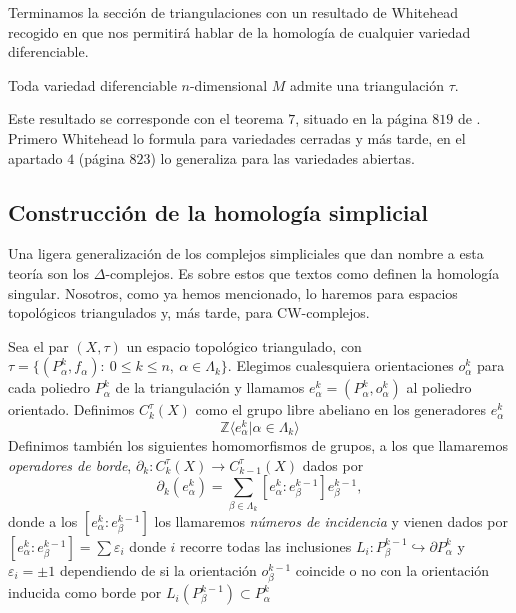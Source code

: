 \bigskip

Terminamos la sección de triangulaciones con un resultado de Whitehead recogido en \cite{Whitehead1978} que nos permitirá hablar de la homología de cualquier variedad diferenciable.

\begin{theorem}
    Toda variedad diferenciable $n$-dimensional $M$ admite una triangulación $\tau$.
\end{theorem}

Este resultado se corresponde con el teorema $7$, situado en la página $819$ de \cite{Whitehead1978}. Primero Whitehead lo formula para variedades cerradas y más tarde, en el apartado $4$ (página $823$) lo generaliza para las variedades abiertas.
\bigskip


\subsection{Construcción de la homología simplicial}

Una ligera generalización de los complejos simpliciales que dan nombre a esta teoría son los $\Delta$-complejos. Es sobre estos que textos como \cite{hatcher2002} definen la homología singular. Nosotros, como ya hemos mencionado, lo haremos para espacios topológicos triangulados y, más tarde, para CW-complejos.

\bigskip

\begin{definition}
    Sea el par $(X,\tau)$ un espacio topológico triangulado, con $\tau = \{(P^k_{\alpha}, f_{\alpha}): ~0\le k \le n, ~\alpha\in \Lambda_k\}$. Elegimos cualesquiera orientaciones $o^k_{\alpha}$ para cada poliedro $P^k_{\alpha}$ de la triangulación y llamamos $e^k_{\alpha}=(P^k_{\alpha},o^k_{\alpha})$ al poliedro orientado. Definimos $C^{\tau}_k(X)$ como el grupo libre abeliano en los generadores $e^k_{\alpha}$
    \begin{equation*}
        \mathbb{Z}\langle e^k_{\alpha} | \alpha \in \Lambda_k \rangle
    \end{equation*}
    Definimos también los siguientes homomorfismos de grupos, a los que llamaremos \textit{operadores de borde}, $\partial_k: C^{\tau}_k(X) \to C^{\tau}_{k-1}(X)$ dados por
    \begin{equation*}
        \partial_k(e^k_{\alpha}) = \sum_{\beta\in\Lambda_k} [e^k_{\alpha} : e^{k-1}_{\beta}]e^{k-1}_{\beta},
    \end{equation*}
    donde a los $[e^k_{\alpha} : e^{k-1}_{\beta}]$ los llamaremos \textit{números de incidencia} y vienen dados por $[e^k_{\alpha} : e^{k-1}_{\beta}] = \sum \varepsilon_i$ donde $i$ recorre todas las inclusiones $L_i: P^{k-1}_{\beta} \hookrightarrow \partial P^k_{\alpha}$ y $\varepsilon_i=\pm 1$ dependiendo de si la orientación $o^{k-1}_{\beta}$ coincide o no con la orientación inducida como borde por $L_i(P^{k-1}_{\beta})\subset P^k_{\alpha}$
\end{definition}

